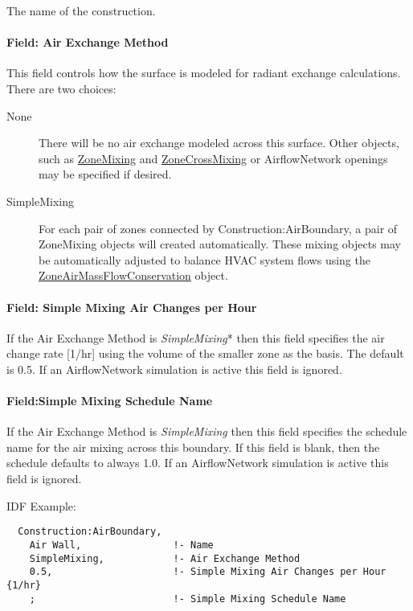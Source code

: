 The name of the construction.

\paragraph{Field: Air Exchange Method}\label{field-air-exchange-method}

This field controls how the surface is modeled for radiant exchange calculations. There are two choices:

\begin{description}
  \item[None] There will be no air exchange modeled across this surface. Other objects, such as \hyperref[zonemixing]{ZoneMixing} and \hyperref[zonecrossmixing]{ZoneCrossMixing} or AirflowNetwork openings may be specified if desired.
  \item[SimpleMixing] For each pair of zones connected by Construction:AirBoundary, a pair of ZoneMixing objects will created automatically. These mixing objects may be automatically adjusted to balance HVAC system flows using the \hyperref[zoneairmassflowconservation]{ZoneAirMassFlowConservation} object.
\end{description}

\paragraph{Field: Simple Mixing Air Changes per Hour}\label{field-simple-mixing-air-changes-per-hour}

If the Air Exchange Method is \textit{SimpleMixing}* then this field specifies the air change rate [1/hr] using the volume of the smaller zone as the basis. The default is 0.5. If an AirflowNetwork simulation is active this field is ignored.

\paragraph{Field:Simple Mixing Schedule Name}\label{field-Simple-mixing-schedule-name}

If the Air Exchange Method is \textit{SimpleMixing} then this field specifies the schedule name for the air mixing across this boundary. If this field is blank, then the schedule defaults to always 1.0. If an AirflowNetwork simulation is active this field is ignored.

IDF Example:

\begin{lstlisting}
  Construction:AirBoundary,
    Air Wall,                !- Name
    SimpleMixing,            !- Air Exchange Method
    0.5,                     !- Simple Mixing Air Changes per Hour {1/hr}
    ;                        !- Simple Mixing Schedule Name
\end{lstlisting}

